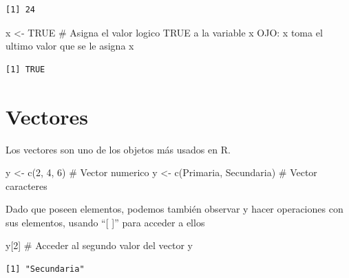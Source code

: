 \documentclass[
  letterpaper,
  DIV=11,
  numbers=noendperiod]{scrreprt}
\newenvironment{Shaded}{\begin{snugshade}}{\end{snugshade}}
\newcommand{\CommentTok}[1]{\textcolor[rgb]{0.37,0.37,0.37}{#1}}
\newcommand{\ConstantTok}[1]{\textcolor[rgb]{0.56,0.35,0.01}{#1}}
\newcommand{\DecValTok}[1]{\textcolor[rgb]{0.68,0.00,0.00}{#1}}
\newcommand{\FunctionTok}[1]{\textcolor[rgb]{0.28,0.35,0.67}{#1}}
\newcommand{\NormalTok}[1]{\textcolor[rgb]{0.00,0.23,0.31}{#1}}
\newcommand{\OtherTok}[1]{\textcolor[rgb]{0.00,0.23,0.31}{#1}}
\newcommand{\StringTok}[1]{\textcolor[rgb]{0.13,0.47,0.30}{#1}}
\begin{document}
\begin{verbatim}
[1] 24
\end{verbatim}

\begin{Shaded}
\begin{Highlighting}[]
\NormalTok{x }\OtherTok{\textless{}{-}} \ConstantTok{TRUE}       \CommentTok{\# Asigna el valor logico TRUE a la variable x OJO: x toma el ultimo valor que se le asigna}
\NormalTok{x}
\end{Highlighting}
\end{Shaded}

\begin{verbatim}
[1] TRUE
\end{verbatim}

\hypertarget{vectores}{%
\section{Vectores}\label{vectores}}

Los vectores son uno de los objetos más usados en R.

\begin{Shaded}
\begin{Highlighting}[]
\NormalTok{y }\OtherTok{\textless{}{-}} \FunctionTok{c}\NormalTok{(}\DecValTok{2}\NormalTok{, }\DecValTok{4}\NormalTok{, }\DecValTok{6}\NormalTok{)     }\CommentTok{\# Vector numerico}
\NormalTok{y }\OtherTok{\textless{}{-}} \FunctionTok{c}\NormalTok{(}\StringTok{\textquotesingle{}Primaria\textquotesingle{}}\NormalTok{, }\StringTok{\textquotesingle{}Secundaria\textquotesingle{}}\NormalTok{) }\CommentTok{\# Vector caracteres}
\end{Highlighting}
\end{Shaded}

Dado que poseen elementos, podemos también observar y hacer operaciones
con sus elementos, usando ``{[} {]}'' para acceder a ellos

\begin{Shaded}
\begin{Highlighting}[]
\NormalTok{y[}\DecValTok{2}\NormalTok{]              }\CommentTok{\# Acceder al segundo valor del vector y}
\end{Highlighting}
\end{Shaded}

\begin{verbatim}
[1] "Secundaria"
\end{verbatim}
\end{document}
